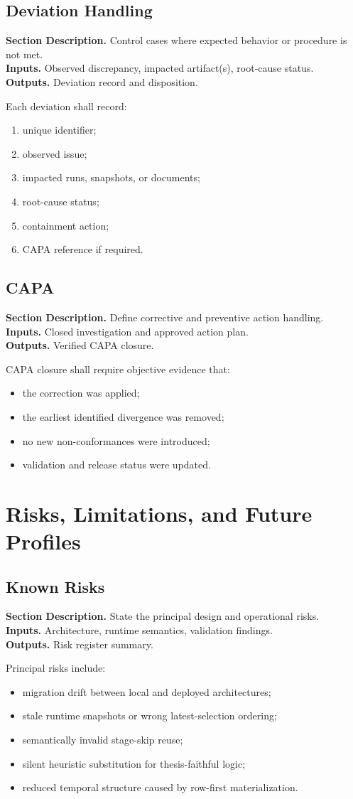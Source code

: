 \documentclass[11pt]{report}
\newcommand{\meta}[3]{\textbf{Section Description.} #1\\
\textbf{Inputs.} #2\\
\textbf{Outputs.} #3\par}
\begin{document}
\section{Deviation Handling}
\meta{Control cases where expected behavior or procedure is not met.}{Observed discrepancy, impacted artifact(s), root-cause status.}{Deviation record and disposition.}

Each deviation shall record:
\begin{enumerate}[leftmargin=1.2cm]
    \item unique identifier;
    \item observed issue;
    \item impacted runs, snapshots, or documents;
    \item root-cause status;
    \item containment action;
    \item CAPA reference if required.
\end{enumerate}

\section{CAPA}
\meta{Define corrective and preventive action handling.}{Closed investigation and approved action plan.}{Verified CAPA closure.}

CAPA closure shall require objective evidence that:
\begin{itemize}
    \item the correction was applied;
    \item the earliest identified divergence was removed;
    \item no new non-conformances were introduced;
    \item validation and release status were updated.
\end{itemize}

\chapter{Risks, Limitations, and Future Profiles}
\section{Known Risks}
\meta{State the principal design and operational risks.}{Architecture, runtime semantics, validation findings.}{Risk register summary.}

Principal risks include:
\begin{itemize}
    \item migration drift between local and deployed architectures;
    \item stale runtime snapshots or wrong latest-selection ordering;
    \item semantically invalid stage-skip reuse;
    \item silent heuristic substitution for thesis-faithful logic;
    \item reduced temporal structure caused by row-first materialization.
\end{itemize}
\end{document}
